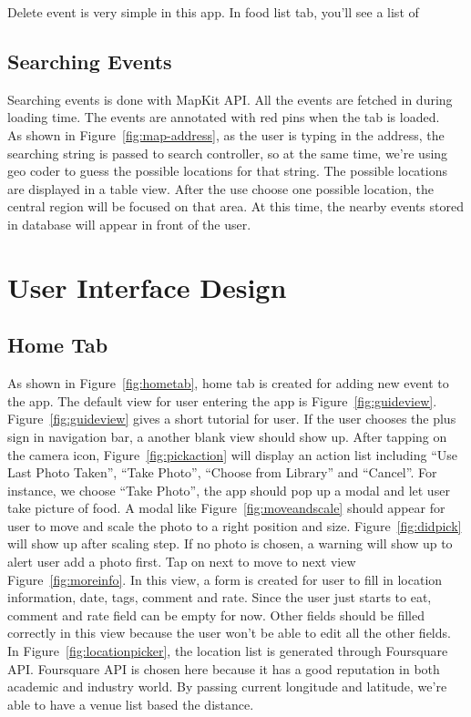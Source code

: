 	Delete event is very simple in this app. In food list tab, you'll see a list of 

\subsection{Searching Events} %
\label{sub:searching_logic}
	
	Searching events is done with MapKit API. All the events are fetched in during loading time. The events are annotated with red pins when the tab is loaded.   \\
	As shown in Figure~\ref{fig:map-address}, as the user is typing in the address, the searching string is passed to search controller, so at the same time, we're using geo coder to guess the possible locations for that string. The possible locations are displayed in a table view. After the use choose one possible location, the central region will be focused on that area. At this time, the nearby events stored in database will appear in front of the user.
	

\newpage
\section{User Interface Design} %
\label{sec:user_interface_design}

\subsection{Home Tab} %
\label{sub:tabs}
	As shown in Figure~\ref{fig:hometab}, home tab is created for adding new event to the app. The default view for user entering the app is Figure~\ref{fig:guideview}. \\
	
	Figure~\ref{fig:guideview} gives a short tutorial for user. If the user chooses the plus sign in navigation bar, a another blank view should show up. After tapping on the camera icon, Figure~\ref{fig:pickaction} will display an action list including ``Use Last Photo Taken'', ``Take Photo'', ``Choose from Library'' and ``Cancel''. For instance, we choose ``Take Photo'', the app should pop up a modal and let user take picture of food. A modal like Figure~\ref{fig:moveandscale} should appear for user to move and scale the photo to a right position and size. Figure~\ref{fig:didpick} will show up after scaling step. If no photo is chosen, a warning will show up to alert user add a photo first. Tap on next to move to next view Figure~\ref{fig:moreinfo}. In this view, a form is created for user to fill in location information, date, tags, comment and rate. Since the user just starts to eat, comment and 
rate field can be empty for now. Other fields should be filled correctly in this view because the user won't be able to edit all the other fields. In Figure~\ref{fig:locationpicker}, the location list is generated through Foursquare API. Foursquare API is chosen here because it has a good reputation in both academic and industry world. By passing current longitude and latitude, we're able to have a venue list based the distance.

